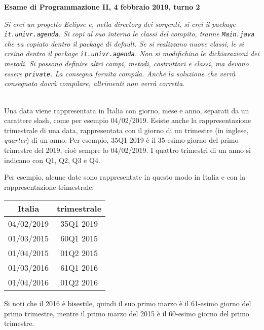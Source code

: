 \documentclass[12pt]{article}
\begin{document}
\begin{center} {\bf Esame di Programmazione II, 4 febbraio 2019, turno 2}\end{center}

\emph{
Si crei un progetto Eclipse e, nella directory dei sorgenti,
si crei il package \texttt{it.univr.agenda}. Si copi al suo interno
le classi del compito, tranne \texttt{Main.java} che va copiato
dentro il package di default.
Se si realizzano nuove classi, le si creino dentro
il package \texttt{it.univr.agenda}.
Non si modifichino le dichiarazioni dei metodi. Si possono definire altri campi,
metodi, costruttori e classi, ma devono essere \texttt{private}.
La consegna fornita compila.
Anche la soluzione che verr\`a consegnata dovr\`a compilare,
altrimenti non verr\`a corretta.
}

\mbox{}\\

Una data viene rappresentata in Italia
con giorno, mese e anno, separati da un carattere slash, come per esempio 04/02/2019.
Esiste anche la rappresentazione trimestrale di una data, rappresentata con il giorno
di un trimestre (in inglese, \emph{quarter})
di un anno. Per esempio, 35Q1 2019 \`e il 35-esimo giorno del primo
trimestre del 2019, cio\`e sempre lo 04/02/2019. I quattro trimestri di un anno
si indicano con Q1, Q2, Q3 e Q4.

Per esempio, alcune date
sono rappresentate in questo modo in Italia e con la rappresentazione trimestrale:
%
\begin{center}
  \begin{tabular}{|c|c|}
    \hline
    Italia & trimestrale \\\hline\hline
    04/02/2019 & 35Q1 2019 \\\hline
    01/03/2015 & 60Q1 2015 \\\hline
    01/04/2015 & 01Q2 2015 \\\hline
    01/03/2016 & 61Q1 2016 \\\hline
    01/04/2016 & 01Q2 2016 \\\hline
  \end{tabular}
\end{center}
%
Si noti che il 2016 \`e bisestile, quindi il suo primo marzo \`e il 61-esimo giorno del primo trimestre,
mentre il primo marzo del 2015 \`e il 60-esimo giorno del primo trimestre.
\end{document}
